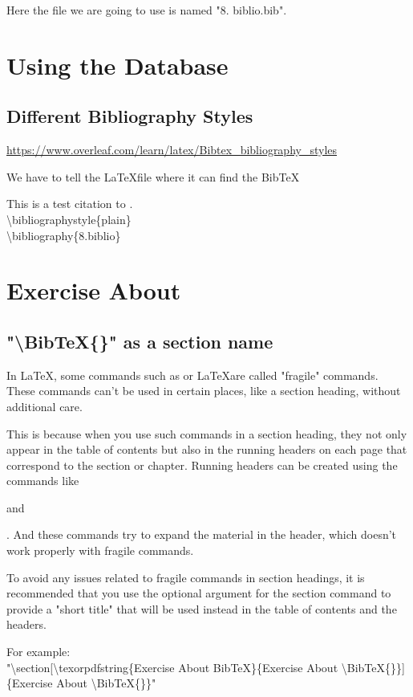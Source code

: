 \documentclass[12pt,titlepage]{article}
\begin{document}
Here the file we are going to use is named "8. biblio.bib".

\newpage
\section{Using the Database}
\subsection{Different Bibliography Styles}
\url{https://www.overleaf.com/learn/latex/Bibtex_bibliography_styles}

We have to tell the \LaTeX file where it can find the BibTeX

This is a test citation to \cite{szkodny2008zbior}. \cite{sheley} \\
\textbackslash bibliographystyle\{plain\}\\
\textbackslash bibliography\{8.biblio\}

\section[\texorpdfstring{Exercise About BibTeX}{Exercise About \BibTeX{}}]{Exercise About \BibTeX{}}

\subsection{"\textbackslash BibTeX\{\}" as a section name}
In LaTeX, some commands such as \BibTeX or \LaTeX are called "fragile" commands. These commands can't be used in certain places, like a section heading, without additional care.

This is because when you use such commands in a section heading, they not only appear in the table of contents but also in the running headers on each page that correspond to the section or chapter. Running headers can be created using the commands like \markboth and \markright. And these commands try to expand the material in the header, which doesn't work properly with fragile commands.

To avoid any issues related to fragile commands in section headings, it is recommended that you use the optional argument for the section command to provide a "short title" that will be used instead in the table of contents and the headers.

For example: \\
"\textbackslash section[\textbackslash texorpdfstring\{Exercise About BibTeX\}\{Exercise About \textbackslash BibTeX\{\}\}] \\
\{Exercise About \textbackslash BibTeX\{\}\}"
\end{document}
